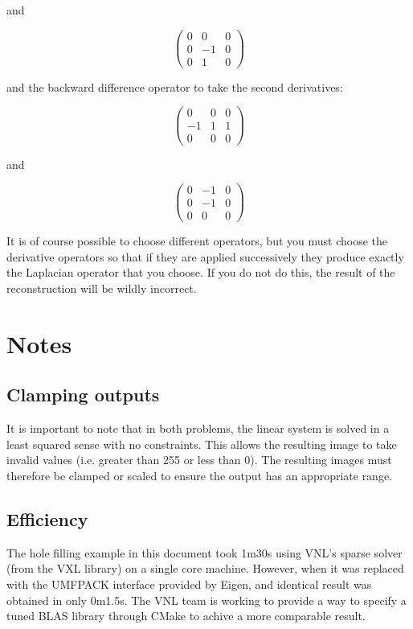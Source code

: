 \documentclass{InsightArticle}
\begin{document}
and

\begin{equation}
\begin{pmatrix}
0 & 0 & 0 \\
0 & -1 & 0\\
0 & 1 & 0
\end{pmatrix}
\end{equation}

and the backward difference operator to take the second derivatives:

\begin{equation}
\begin{pmatrix}
0 & 0 & 0 \\
-1 & 1 & 1\\
0 & 0 & 0
\end{pmatrix}
\end{equation}

and

\begin{equation}
\begin{pmatrix}
0 & -1 & 0 \\
0 & -1 & 0\\
0 & 0 & 0
\end{pmatrix}
\end{equation}

It is of course possible to choose different operators, but you must choose the derivative operators so that if they are applied successively they produce exactly the Laplacian operator that you choose. If you do not do this, the result of the reconstruction will be wildly incorrect.

\section{Notes}
\subsection{Clamping outputs}
It is important to note that in both problems, the linear system is solved in a least squared sense with no constraints. This allows the resulting image to take invalid values (i.e. greater than 255 or less than 0). The resulting images must therefore be clamped or scaled to ensure the output has an appropriate range.

\subsection{Efficiency}
The hole filling example in this document took 1m30s using VNL's sparse solver (from the VXL library) on a single core machine. However, when it was replaced with the UMFPACK interface provided by Eigen, and identical result was obtained in only 0m1.5s. The VNL team is working to provide a way to specify a tuned BLAS library through CMake to achive a more comparable result.


\end{document}
